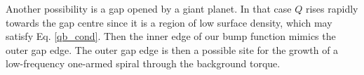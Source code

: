 {  %
  
  Another possibility is a gap opened by a giant planet. In that case $Q$
  rises rapidly towards the gap centre since it is a region of low
  surface density, which may satisfy Eq. \ref{qb_cond}. Then the inner
  edge of our bump
  function mimics the outer gap edge. The outer gap edge is then a
  possible site for the growth of a low-frequency one-armed spiral
  through the background torque. 

}






